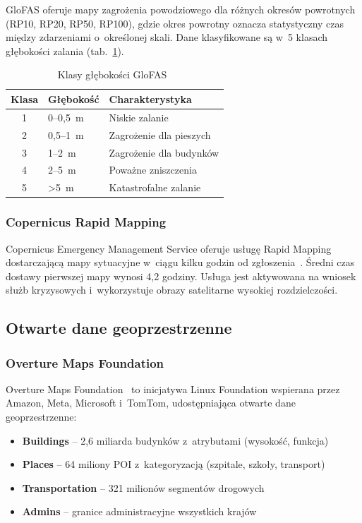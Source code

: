 GloFAS oferuje mapy zagrożenia powodziowego dla różnych okresów powrotnych (RP10, RP20, RP50, RP100), gdzie okres powrotny oznacza statystyczny czas między zdarzeniami o~określonej skali. Dane klasyfikowane są w~5 klasach głębokości zalania (tab.~\ref{tab:glofas_classes}).

\begin{table}[H]
    \centering
    \caption{Klasy głębokości GloFAS~\cite{glofas2024}}
    \begin{tabular}{|c|l|l|}
        \hline
        \textbf{Klasa} & \textbf{Głębokość} & \textbf{Charakterystyka} \\
        \hline
        1 & 0--0,5~m & Niskie zalanie \\
        \hline
        2 & 0,5--1~m & Zagrożenie dla pieszych \\
        \hline
        3 & 1--2~m & Zagrożenie dla budynków \\
        \hline
        4 & 2--5~m & Poważne zniszczenia \\
        \hline
        5 & >5~m & Katastrofalne zalanie \\
        \hline
    \end{tabular}
    \label{tab:glofas_classes}
\end{table}

\subsubsection{Copernicus Rapid Mapping}

Copernicus Emergency Management Service oferuje usługę Rapid Mapping dostarczającą mapy sytuacyjne w~ciągu kilku godzin od zgłoszenia~\cite{copernicus2024ems}. Średni czas dostawy pierwszej mapy wynosi 4,2 godziny. Usługa jest aktywowana na wniosek służb kryzysowych i~wykorzystuje obrazy satelitarne wysokiej rozdzielczości.

\subsection{Otwarte dane geoprzestrzenne}

\subsubsection{Overture Maps Foundation}

Overture Maps Foundation~\cite{overture2024foundation} to inicjatywa Linux Foundation wspierana przez Amazon, Meta, Microsoft i~TomTom, udostępniająca otwarte dane geoprzestrzenne:
\begin{itemize}
    \item \textbf{Buildings} -- 2,6 miliarda budynków z~atrybutami (wysokość, funkcja)
    \item \textbf{Places} -- 64 miliony POI z~kategoryzacją (szpitale, szkoły, transport)
    \item \textbf{Transportation} -- 321 milionów segmentów drogowych
    \item \textbf{Admins} -- granice administracyjne wszystkich krajów
\end{itemize}

